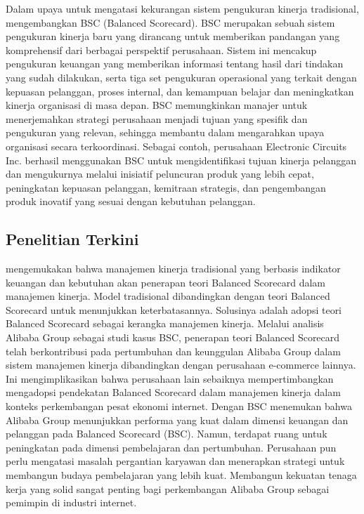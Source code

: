 \documentclass{article}
\begin{document}
Dalam upaya untuk mengatasi kekurangan sistem pengukuran kinerja tradisional, \cite{Kaplan2015TheBS} mengembangkan BSC (Balanced Scorecard). BSC merupakan sebuah sistem pengukuran kinerja baru yang dirancang untuk memberikan pandangan yang komprehensif dari berbagai perspektif perusahaan. Sistem ini mencakup pengukuran keuangan yang memberikan informasi tentang hasil dari tindakan yang sudah dilakukan, serta tiga set pengukuran operasional yang terkait dengan kepuasan pelanggan, proses internal, dan kemampuan belajar dan meningkatkan kinerja organisasi di masa depan. BSC memungkinkan manajer untuk menerjemahkan strategi perusahaan menjadi tujuan yang spesifik dan pengukuran yang relevan, sehingga membantu dalam mengarahkan upaya organisasi secara terkoordinasi. Sebagai contoh, perusahaan Electronic Circuits Inc. berhasil menggunakan BSC untuk mengidentifikasi tujuan kinerja pelanggan dan mengukurnya melalui inisiatif peluncuran produk yang lebih cepat, peningkatan kepuasan pelanggan, kemitraan strategis, dan pengembangan produk inovatif yang sesuai dengan kebutuhan pelanggan.


 
\subsection*{Penelitian Terkini}

\cite{Qiu2020} mengemukakan bahwa manajemen kinerja tradisional yang berbasis indikator keuangan dan kebutuhan akan penerapan teori Balanced Scorecard dalam manajemen kinerja. Model tradisional dibandingkan dengan teori Balanced Scorecard untuk menunjukkan keterbatasannya. Solusinya adalah adopsi teori Balanced Scorecard sebagai kerangka manajemen kinerja. Melalui analisis Alibaba Group sebagai studi kasus BSC, penerapan teori Balanced Scorecard telah berkontribusi pada pertumbuhan dan keunggulan Alibaba Group dalam sistem manajemen kinerja dibandingkan dengan perusahaan e-commerce lainnya. Ini mengimplikasikan bahwa perusahaan lain sebaiknya mempertimbangkan mengadopsi pendekatan Balanced Scorecard dalam manajemen kinerja dalam konteks perkembangan pesat ekonomi internet. Dengan BSC \cite{Qiu2020} menemukan  bahwa Alibaba Group menunjukkan performa yang kuat dalam dimensi keuangan dan pelanggan pada Balanced Scorecard (BSC). Namun, terdapat ruang untuk peningkatan pada dimensi pembelajaran dan pertumbuhan. Perusahaan pun perlu mengatasi masalah pergantian karyawan dan menerapkan strategi untuk membangun budaya pembelajaran yang lebih kuat. Membangun kekuatan tenaga kerja yang solid sangat penting bagi perkembangan Alibaba Group sebagai pemimpin di industri internet.
\end{document}
